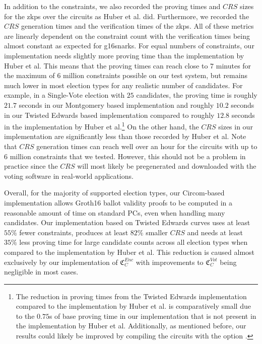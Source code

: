 In addition to the constraints, we also recorded the proving times and $CRS$ sizes for the \glspl{zkp} over the circuits as Huber et al. did.
Furthermore, we recorded the $CRS$ generation times and the verification times of the \glspl{zkp}.
All of these metrics are linearly dependent on the constraint count with the verification times being almost constant as expected for \glspl{g16snark}.
For equal numbers of constraints, our implementation needs slightly more proving time than the implementation by Huber et al.
This means that the proving times can reach close to $7$ minutes for the maximum of $6$ million constraints possible on our test system, but remains much lower in most election types for any realistic number of candidates.
For example, in a Single-Vote election with $25$ candidates, the proving time is roughly $21.7$ seconds in our Montgomery based implementation and roughly $10.2$ seconds in our Twisted Edwards based implementation compared to roughly $12.8$ seconds in the implementation by Huber et al.\footnote{
    \label{footnote:singleVoteRealisticExampleProvingTimes}
    The reduction in proving times from the Twisted Edwards implementation compared to the implementation by Huber et al. is comparatively small due to the $0.75$s of base proving time in our implementation that is not present in the implementation by Huber et al.
    Additionally, as mentioned before, our results could likely be improved by compiling the circuits with the option .
}
On the other hand, the $CRS$ sizes in our implementation are significantly less than those recorded by Huber et al.
Note that $CRS$ generation times can reach well over an hour for the circuits with up to $6$ million constraints that we tested.
However, this should not be a problem in practice since the $CRS$ will most likely be pregenerated and downloaded with the voting software in real-world applications.

Overall, for the majority of supported election types, our Circom-based implementation allows Groth16 ballot validity proofs to be computed in a reasonable amount of time on standard PCs, even when handling many candidates.
Our implementation based on Twisted Edwards curves uses at least $55\%$ fewer constraints, produces at least $82\%$ smaller $CRS$ and needs at least $35\%$ less proving time for large candidate counts across all election types when compared to the implementation by Huber et al. 
This reduction is caused almost exclusively by our implementation of $\mathfrak{C}_C^{Enc}$ with improvements to $\mathfrak{C}_C^{Vot}$ being negligible in most cases.